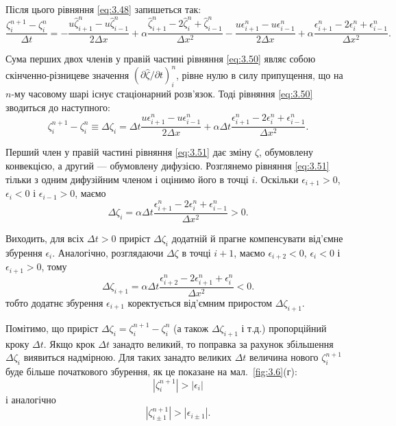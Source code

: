 Після цього рівняння \eqref{eq:3.48} запишеться так:
\begin{equation}
    \label{eq:3.50}
    \frac{\zeta_i^{n + 1} - \zeta_i^n}{\Delta t} = - \frac{u \hat{\zeta}_{i + 1}^n - u \hat{\zeta}_{i - 1}^n}{2 \Delta x} + \alpha \frac{\hat{\zeta}_{i + 1}^n - 2 \hat{\zeta}_i^n + \hat{\zeta}_{i - 1}^n}{\Delta x^2} - \frac{u \epsilon_{i + 1}^n - u \epsilon_{i - 1}^n}{2 \Delta x} + \alpha \frac{\epsilon_{i + 1}^n - 2 \epsilon_i^n + \epsilon_{i - 1}^n}{\Delta x^2}.
\end{equation}

Сума перших двох членів у правій частині рівняння \eqref{eq:3.50} являє собою скінченно-різницеве значення $(\partial \hat{\zeta} / \partial t)_i^n$, рівне нулю в силу припущення, що на $n$-му часовому шарі існує стаціонарний розв'язок. Тоді рівняння \eqref{eq:3.50} зводиться до наступного:
\begin{equation}
    \label{eq:3.51}
    \zeta_i^{n + 1} - \zeta_i^n \equiv \Delta \zeta_i = \Delta t \frac{u \epsilon_{i + 1}^n - u \epsilon_{i - 1}^n}{2 \Delta x} + \alpha \Delta t \frac{\epsilon_{i + 1}^n - 2 \epsilon_i^n + \epsilon_{i - 1}^n}{\Delta x^2}.
\end{equation}

Перший член у правій частині рівняння \eqref{eq:3.51} дає зміну $\zeta$, обумовлену конвекцією, а другий --- обумовлену дифузією.
Розглянемо рівняння \eqref{eq:3.51} тільки з одним дифузійним членом і оцінимо його в точці $i$. Оскільки $\epsilon_{i + 1} > 0$, $\epsilon_i < 0$ і $\epsilon_{i - 1} > 0$, маємо
\begin{equation}
    \label{eq:3.52}
    \Delta \zeta_i = \alpha \Delta t \frac{\epsilon_{i + 1}^n - 2 \epsilon_i^n + \epsilon_{i - 1}^n}{\Delta x^2} > 0.
\end{equation}

Виходить, для всіх $\Delta t > 0$ приріст $\Delta \zeta_i$ додатній й прагне компенсувати від'ємне збурення $\epsilon_i$.
Аналогічно, розглядаючи $\Delta \zeta$ в точці $i + 1$, маємо $\epsilon_{i + 2} < 0$, $\epsilon_i < 0$ і $\epsilon_{i + 1} > 0$, тому
\begin{equation}
    \label{eq:3.53}
    \Delta \zeta_{i + 1} = \alpha \Delta t \frac{\epsilon_{i + 2}^n - 2 \epsilon_{i + 1}^n + \epsilon_i^n}{\Delta x^2} < 0.
\end{equation}
тобто додатнє збурення $\epsilon_{i + 1}$ коректується від'ємним приростом $\Delta \zeta_{i + 1}$. \medskip

Помітимо, що приріст $\Delta \zeta_i = \zeta_i^{n + 1} - \zeta_i^n$ (а також $\Delta \zeta_{i + 1}$ і т.д.) пропорційний кроку $\Delta t$. Якщо крок $\Delta t$ занадто великий, то поправка за рахунок збільшення $\Delta \zeta_i$  виявиться надмірною. Для таких занадто великих $\Delta t$ величина нового $\zeta_i^{n + 1}$ буде більше початкового збурення, як це показане на мал.~\ref{fig:3.6}(г):
\begin{equation}
    \label{eq:3.54}
    |\zeta_i^{n + 1}| > |\epsilon_i|
\end{equation}
і аналогічно
\begin{equation}
    \label{eq:3.55}
    |\zeta_{i \pm 1}^{n + 1}| > |\epsilon_{i \pm 1}|.
\end{equation}

